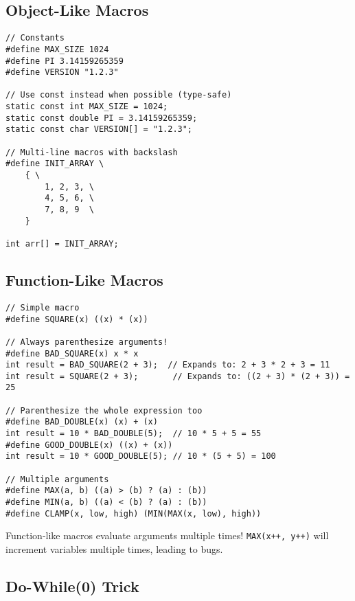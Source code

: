 \subsection{Object-Like Macros}

\begin{lstlisting}
// Constants
#define MAX_SIZE 1024
#define PI 3.14159265359
#define VERSION "1.2.3"

// Use const instead when possible (type-safe)
static const int MAX_SIZE = 1024;
static const double PI = 3.14159265359;
static const char VERSION[] = "1.2.3";

// Multi-line macros with backslash
#define INIT_ARRAY \
    { \
        1, 2, 3, \
        4, 5, 6, \
        7, 8, 9  \
    }

int arr[] = INIT_ARRAY;
\end{lstlisting}

\subsection{Function-Like Macros}

\begin{lstlisting}
// Simple macro
#define SQUARE(x) ((x) * (x))

// Always parenthesize arguments!
#define BAD_SQUARE(x) x * x
int result = BAD_SQUARE(2 + 3);  // Expands to: 2 + 3 * 2 + 3 = 11
int result = SQUARE(2 + 3);       // Expands to: ((2 + 3) * (2 + 3)) = 25

// Parenthesize the whole expression too
#define BAD_DOUBLE(x) (x) + (x)
int result = 10 * BAD_DOUBLE(5);  // 10 * 5 + 5 = 55
#define GOOD_DOUBLE(x) ((x) + (x))
int result = 10 * GOOD_DOUBLE(5); // 10 * (5 + 5) = 100

// Multiple arguments
#define MAX(a, b) ((a) > (b) ? (a) : (b))
#define MIN(a, b) ((a) < (b) ? (a) : (b))
#define CLAMP(x, low, high) (MIN(MAX(x, low), high))
\end{lstlisting}

\begin{warningbox}
Function-like macros evaluate arguments multiple times! \texttt{MAX(x++, y++)} will increment variables multiple times, leading to bugs.
\end{warningbox}

\subsection{Do-While(0) Trick}

